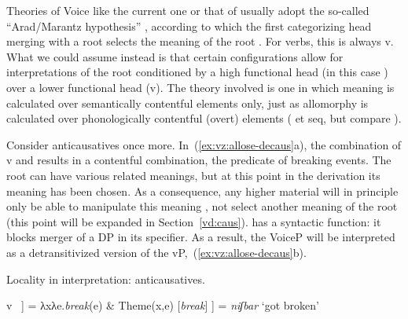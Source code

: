 \begin{exe}
\begin{xlist}
\begin{xlist}
\begin{exe}
\begin{xlist}
\begin{xlist}
\begin{exe}
\begin{xlist}
\begin{xlist}
\begin{exe}
\begin{exe}
\begin{xlist}
\begin{exe}
\begin{exe}
\begin{xlist}
\begin{exe}
\begin{exe}
\begin{exe}
\begin{exe}
\begin{exe}
\begin{xlist}
\begin{exe}
\begin{xlist}
\begin{exe}
\begin{exe}
\begin{xlist}
\begin{exe}
\begin{xlist}
\begin{exe}
\begin{xlist}
\begin{exe}
\begin{exe}
\begin{exe}
\begin{xlist}
\begin{exe}
\begin{exe}
Theories of Voice like the current one or that of \cite{layering15} usually adopt the so-called ``Arad/Marantz hypothesis'' \citep{elenasamioti14}, according to which the first categorizing head merging with a root selects the meaning of the root \citep{arad03,marantz13}. For verbs, this is always v. What we could assume instead is that certain configurations allow for interpretations of the root conditioned by a high functional head (in this case {\vz}) over a lower functional head (v). The theory involved is one in which meaning is calculated over semantically contentful elements only, just as allomorphy is calculated over phonologically contentful (overt) elements (\citealt{embick10} et seq, but compare \citealt{kastnermoskal18}).

Consider anticausatives once more. In~(\ref{ex:vz:allose-decaus}a), the combination of v and  results in a contentful combination, the predicate of breaking events. The root can have various related meanings, but at this point in the derivation its meaning has been chosen. As a consequence, any higher material will in principle only be able to manipulate this meaning \citep{arad03}, not select another meaning of the root (this point will be expanded in Section~\ref{vd:caus}). {\vz} has a syntactic function: it blocks merger of a DP in its specifier. As a result, the VoiceP will be interpreted as a detransitivized version of the vP,~(\ref{ex:vz:allose-decaus}b).

 \begin{exe}
 \ex  Locality in interpretation: anticausatives.\label{ex:vz:allose-decaus} 
 \begin{xlist} 
     \ex  {[}v ~\!] = λxλe.\emph{break}(e) \& Theme(x,e) 
     \ex  {[}\textbf{\vz} [\emph{break}] ] = \emph{niʃbar} `got broken' 
 \z
\z 


\end{xlist}
\end{exe}
\end{exe}
\end{exe}
\end{xlist}
\end{exe}
\end{exe}
\end{exe}
\end{xlist}
\end{exe}
\end{xlist}
\end{exe}
\end{xlist}
\end{exe}
\end{exe}
\end{xlist}
\end{exe}
\end{xlist}
\end{exe}
\end{exe}
\end{exe}
\end{exe}
\end{exe}
\end{xlist}
\end{exe}
\end{exe}
\end{xlist}
\end{exe}
\end{exe}
\end{xlist}
\end{xlist}
\end{exe}
\end{xlist}
\end{xlist}
\end{exe}
\end{xlist}
\end{xlist}
\end{exe}
